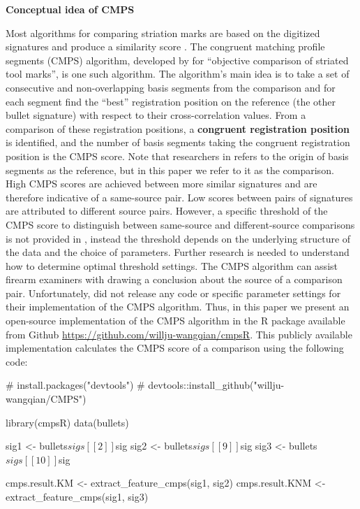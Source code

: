 \textbf{Conceptual idea of CMPS}

Most algorithms for comparing striation marks are based on the digitized
signatures and produce a similarity score
\citep[\citet{ChumbleyL_Scott2010VoTM}, \citet{aoas},
\citet{pmid30444940}]{song2005}. The congruent matching profile segments
(CMPS) algorithm, developed by \citet{cmps} for ``objective comparison
of striated tool marks'', is one such algorithm. The algorithm's main
idea is to take a set of consecutive and non-overlapping basis segments
from the comparison and for each segment find the ``best'' registration
position on the reference (the other bullet signature) with respect to
their cross-correlation values. From a comparison of these registration
positions, a \textbf{congruent registration position} is identified, and
the number of basis segments taking the congruent registration position
is the CMPS score. Note that researchers in \citet{cmps} refers to the
origin of basis segments as the reference, but in this paper we refer to
it as the comparison. High CMPS scores are achieved between more similar
signatures and are therefore indicative of a same-source pair. Low
scores between pairs of signatures are attributed to different source
pairs. However, a specific threshold of the CMPS score to distinguish
between same-source and different-source comparisons is not provided in
\citet{cmps}, instead the threshold depends on the underlying structure
of the data and the choice of parameters.
Further research is needed to understand how to determine optimal
threshold settings. The CMPS algorithm can assist firearm examiners with
drawing a conclusion about the source of a comparison pair.
Unfortunately, \citet{cmps} did not release any code or specific
parameter settings for their implementation of the CMPS algorithm. Thus,
in this paper we present an open-source implementation of the CMPS
algorithm in the R package  available from Github
\url{https://github.com/willju-wangqian/cmpsR}. This publicly available
implementation calculates the CMPS score of a comparison using the
following code:

\begin{Schunk}
\begin{Sinput}
# install.packages("devtools") 
# devtools::install_github("willju-wangqian/CMPS")

library(cmpsR)
data(bullets)

sig1 <- bullets$sigs[[2]]$sig
sig2 <- bullets$sigs[[9]]$sig
sig3 <- bullets$sigs[[10]]$sig

cmps.result.KM <- extract_feature_cmps(sig1, sig2)
cmps.result.KNM <- extract_feature_cmps(sig1, sig3)
\end{Sinput}
\end{Schunk}

